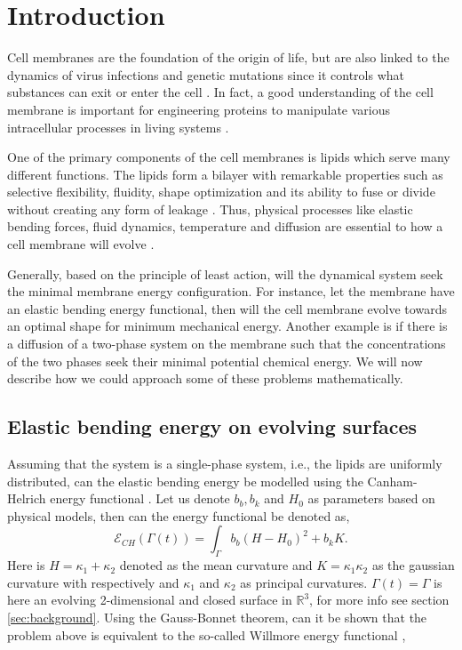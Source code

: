 \section{Introduction}\label{sec:introduction}

Cell membranes are the foundation of the origin of life, but are also linked to the dynamics of virus infections and genetic mutations since it controls what substances can exit or enter the cell \cite{nelson2008lehninger,hurley2010membrane}. In fact, a good understanding of the cell membrane is important for engineering proteins to manipulate various intracellular processes in living systems \cite{rojas1998genetic}.

One of the primary components of the cell membranes is lipids which serve many different functions. The lipids form a bilayer with remarkable properties such as selective flexibility, fluidity, shape optimization and its ability to fuse or divide without creating any form of leakage \cite{nelson2008lehninger}. Thus, physical processes like elastic
bending forces, fluid dynamics, temperature and diffusion are essential to how a cell membrane will evolve \cite{udo97,neidleman87}.

Generally, based on the principle of least action, will the dynamical system seek the minimal membrane energy configuration. For instance, let the membrane have an elastic bending energy functional, then will the cell membrane evolve towards an optimal shape for minimum mechanical energy. Another example is if there is a diffusion of a two-phase system on the membrane such that the concentrations of the two phases seek their minimal potential chemical energy. We will now describe how we could approach some of these problems mathematically.


\subsection{Elastic bending energy on evolving surfaces}%
\label{sub:willmore_flow}

Assuming that the system is a single-phase system, i.e., the lipids are uniformly distributed, can the elastic bending energy be modelled using the Canham-Helrich energy functional \cite{helfrich1973elastic, wang08, udo97}. Let us denote $b_{b},
b_{k}$ and $H_{0}$ as parameters based on physical models, then can the energy functional be denoted as,
\begin{equation}
\label{eq:CH}
\mathcal{E} _{CH}\left( \Gamma\left( t \right)   \right) =   \int_{\Gamma  }^{}  b_{b} \left( H- H_{0} \right) ^{2} + b_{k} K
.\end{equation}
Here is $H =  \kappa_1 + \kappa_2 $ denoted as the mean curvature and $K = \kappa_1 \kappa_2$ as the gaussian curvature with respectively and $\kappa_1$ and $\kappa_2$ as principal curvatures. $\Gamma \left( t
\right) = \Gamma  $ is here an evolving 2-dimensional and closed surface in $\mathbb{R} ^3$, for more info see section \ref{sec:background}.  Using the Gauss-Bonnet theorem, can it be shown that the problem above is equivalent to the so-called Willmore energy
functional \cite{montiel2009curves, willmore1996riemannian},

